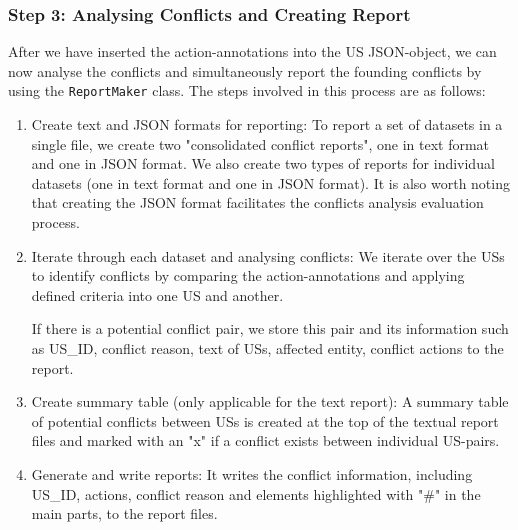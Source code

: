 \subsubsection*{Step 3: Analysing Conflicts and Creating Report}
After we have inserted the action-annotations into the US JSON-object, we can now analyse the conflicts and simultaneously report the founding conflicts by using the \texttt{ReportMaker} class. The steps involved in this process are as follows:
\begin{enumerate}
	\item Create text and JSON formats for reporting: To report a set of datasets in a single file, we create two "consolidated conflict reports", one in text format and one in JSON format. We also create two types of reports for individual datasets (one in text format and one in JSON format). It is also worth noting that creating the JSON format facilitates the conflicts analysis evaluation process.
	
	\item Iterate through each dataset and analysing conflicts: We iterate over the USs to identify conflicts by comparing the action-annotations and applying defined criteria into one US and another.
	
	If there is a potential conflict pair, we store this pair and its information such as US\_ID, conflict reason, text of USs, affected entity, conflict actions to the report. 
	
	\item Create summary table (only applicable for the text report): A summary table of potential conflicts between USs is created at the top of the textual report files and marked with an "x" if a conflict exists between individual US-pairs.
	
	\item Generate and write reports: It writes the conflict information, including US\_ID, actions, conflict reason and elements highlighted with "\#" in the main parts, to the report files.
\end{enumerate}
